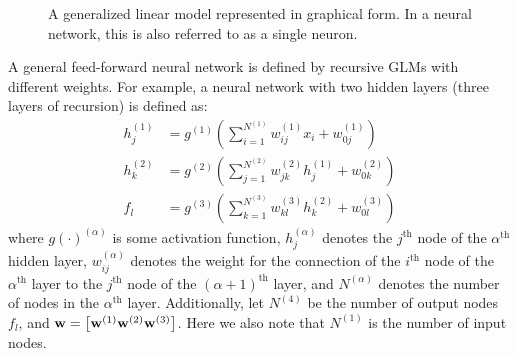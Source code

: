 \def\layersep{2.5cm}
\begin{figure}[h]
\centering{}

\caption{\label{fig:GLM}
A generalized linear model represented in graphical form.
In a neural network, this is also referred to as a single neuron.
}
\end{figure}


A general feed-forward neural network is defined by recursive GLMs
with different weights.
For example, a neural network with two hidden layers
(three layers of recursion) is defined as:
%
\begin{equation}
\begin{aligned}
	h^{(1)}_j &= g^{(1)}
		\left(\sum_{i=1}^{N^{(1)}} w_{ij}^{(1)} x_i + 
      w^{(1)}_{0j} \right) \\
	h^{(2)}_k &= g^{(2)}
		\left(\sum_{j=1}^{N^{(2)}} w_{jk}^{(2)} h_j^{(1)} + 
      w^{(2)}_{0k} \right) \\
	f_l &= g^{(3)}
		\left(\sum_{k=1}^{N^{(3)}} w_{kl}^{(3)} h_k^{(2)} + 
      w^{(3)}_{0l} \right)
\end{aligned}
\end{equation}
%
where $g(\cdot)^{(\alpha)}$ is some activation function,
$h^{(\alpha)}_j$ denotes the $j^\text{th}$ node of the $\alpha^\text{th}$ 
hidden layer,
$w_{ij}^{(\alpha)}$ denotes the weight for the connection of 
the $i^\text{th}$ node of the $\alpha^\text{th}$ layer to 
the $j^\text{th}$ node of the $(\alpha+1)^\text{th}$ layer,
and $N^{(\alpha)}$ denotes the number of nodes in the $\alpha^\text{th}$ layer.
Additionally, let $N^{(4)}$ be the number of 
output nodes $f_l$,
and $\mathbf{w} = \left[\mathbf{w}^{(1)} \mathbf{w}^{(2)} \mathbf{w}^{(3)} \right]$.
Here we also note that $N^{(1)}$ is the number of input nodes.

